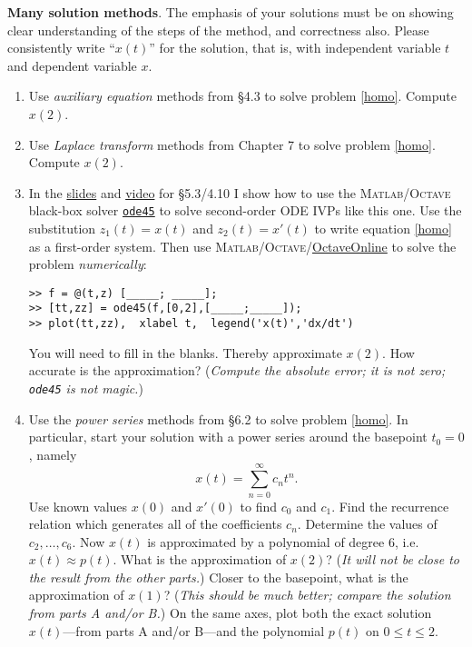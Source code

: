 \documentclass[12pt]{article}
\theoremstyle{definition}
\newcommand{\Matlab}{\textsc{Matlab}\xspace}
\newcommand{\Octave}{\textsc{Octave}\xspace}
\begin{document}
\medskip
\textbf{Many solution methods}.  The emphasis of your solutions must be on showing clear understanding of the steps of the method, and correctness also.  Please consistently write ``$x(t)$'' for the solution, that is, with independent variable $t$ and dependent variable $x$.

\renewcommand{\labelenumi}{\Alph{enumi}.}
\begin{enumerate}
\item Use \emph{auxiliary equation} methods from \S4.3 to solve problem \eqref{homo}.  Compute $x(2)$.
\item Use \emph{Laplace transform} methods from Chapter 7 to solve problem \eqref{homo}.  Compute $x(2)$.
\item In the \href{https://bueler.github.io/math302/assets/slides/5-3.pdf}{slides} and \href{https://expl.ai/VSJTFRC}{video} for \S5.3/4.10 I show how to use the \Matlab/\Octave black-box solver \href{https://www.mathworks.com/help/matlab/ref/ode45.html}{\texttt{ode45}} to solve second-order ODE IVPs like this one.  Use the substitution $z_1(t)=x(t)$ and $z_2(t)=x'(t)$ to write equation \eqref{homo} as a first-order system.  Then use \Matlab/\Octave/\href{https://octave-online.net/}{OctaveOnline} to solve the problem \emph{numerically}:
\begin{Verbatim}[fontsize=\small]
>> f = @(t,z) [_____; _____];
>> [tt,zz] = ode45(f,[0,2],[_____;_____]);
>> plot(tt,zz),  xlabel t,  legend('x(t)','dx/dt')
\end{Verbatim}
You will need to fill in the blanks.  Thereby approximate $x(2)$.  How accurate is the approximation?  (\emph{Compute the absolute error; it is \emph{not} zero; \emph{\texttt{ode45}} is \emph{not} magic.})
\item Use the \emph{power series} methods from \S6.2 to solve problem \eqref{homo}.  In particular, start your solution with a power series around the basepoint $t_0=0$, namely
    $$x(t) = \sum_{n=0}^\infty c_n t^n.$$
Use known values $x(0)$ and $x'(0)$ to find $c_0$ and $c_1$.  Find the recurrence relation which generates all of the coefficients $c_n$.  Determine the values of $c_2,\dots,c_6$.  Now $x(t)$ is approximated by a polynomial of degree 6, i.e.~$x(t)\approx p(t)$.  What is the approximation of $x(2)$?  (\emph{It will not be close to the result from the other parts.})  Closer to the basepoint, what is the approximation of $x(1)$?  (\emph{This should be much better; compare the solution from parts A and/or B.})  On the same axes, plot both the exact solution $x(t)$---from parts A and/or B---and the polynomial $p(t)$ on $0\le t \le 2$.

\end{enumerate}
\end{document}
